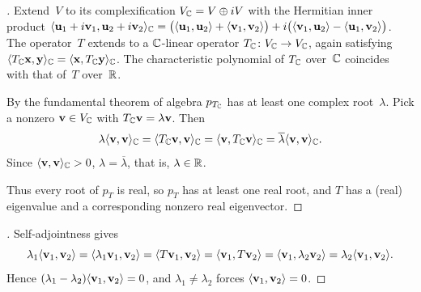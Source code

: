 \begin{proof}[]
Extend~$V$ to its complexification $V_{\mathbb{C}} = V \oplus iV$ with the
Hermitian inner product
$\langle \mathbf{u}_1 + i\mathbf{v}_1, \mathbf{u}_2 + i\mathbf{v}_2 \rangle_{\mathbb{C}}
= \bigl(\langle \mathbf{u}_1, \mathbf{u}_2 \rangle + \langle \mathbf{v}_1, \mathbf{v}_2 \rangle\bigr)
+ i\bigl(\langle \mathbf{v}_1, \mathbf{u}_2 \rangle - \langle \mathbf{u}_1, \mathbf{v}_2 \rangle\bigr)$.
The operator~$T$ extends to a $\mathbb{C}$-linear operator
$T_{\mathbb{C}} \colon V_{\mathbb{C}} \to V_{\mathbb{C}}$, again satisfying
$\langle T_{\mathbb{C}}\mathbf{x}, \mathbf{y} \rangle_{\mathbb{C}} = \langle \mathbf{x}, T_{\mathbb{C}}\mathbf{y} \rangle_{\mathbb{C}}$.
The characteristic polynomial of $T_{\mathbb{C}}$ over~$\mathbb{C}$ coincides with that
of~$T$ over~$\mathbb{R}$.

By the fundamental theorem of algebra $p_{T_{\mathbb{C}}}$ has at least one
complex root~$\lambda$. Pick a nonzero
$\mathbf{v} \in V_{\mathbb{C}}$ with $T_{\mathbb{C}}\mathbf{v} = \lambda \mathbf{v}$. Then
\[
  \lambda \langle \mathbf{v}, \mathbf{v} \rangle_{\mathbb{C}}
  = \langle T_{\mathbb{C}}\mathbf{v}, \mathbf{v} \rangle_{\mathbb{C}}
  = \langle \mathbf{v}, T_{\mathbb{C}}\mathbf{v} \rangle_{\mathbb{C}}
  = \overline{\lambda} \langle \mathbf{v}, \mathbf{v} \rangle_{\mathbb{C}}.
\]
Since $\langle \mathbf{v}, \mathbf{v} \rangle_{\mathbb{C}} > 0$,
$\lambda = \overline{\lambda}$, that is, $\lambda \in \mathbb{R}$.

Thus every root of $p_T$ is real, so $p_T$ has at least one real
root, and $T$ has a (real) eigenvalue and a corresponding nonzero
real eigenvector.
\end{proof}

\begin{proof}[]
Self-adjointness gives
\[
  \lambda_1 \langle \mathbf{v}_1, \mathbf{v}_2 \rangle
  = \langle \lambda_1 \mathbf{v}_1, \mathbf{v}_2 \rangle
  = \langle T\mathbf{v}_1, \mathbf{v}_2 \rangle
  = \langle \mathbf{v}_1, T\mathbf{v}_2 \rangle
  = \langle \mathbf{v}_1, \lambda_2 \mathbf{v}_2 \rangle
  = \lambda_2 \langle \mathbf{v}_1, \mathbf{v}_2 \rangle.
\]
Hence $(\lambda_1 - \lambda_2) \langle \mathbf{v}_1, \mathbf{v}_2 \rangle = 0$,
and $\lambda_1 \neq \lambda_2$ forces
$\langle \mathbf{v}_1, \mathbf{v}_2 \rangle = 0$.
\end{proof}

